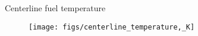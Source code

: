 \begin{frame}{Centerline fuel temperature}

    \scriptsize

    \begin{figure}[h]
        \texttt{[image: figs/centerline\_temperature,\_K]}
    \end{figure}

\end{frame}